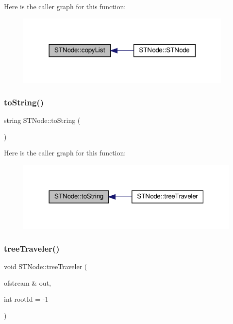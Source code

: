 Here is the caller graph for this function\+:\nopagebreak
\begin{figure}[H]
\begin{center}
\leavevmode
\includegraphics[width=306pt]{d0/d75/class_s_t_node_a55d1f2a5254f3ef8ec9f0f5023177798_icgraph}
\end{center}
\end{figure}
\mbox{\label{class_s_t_node_acb631ef4448c8faf7c88c9c61568ca0a}} 
\subsubsection{\texorpdfstring{to\+String()}{toString()}}
{\footnotesize\ttfamily string S\+T\+Node\+::to\+String (\begin{DoxyParamCaption}{ }\end{DoxyParamCaption})}

Here is the caller graph for this function\+:\nopagebreak
\begin{figure}[H]
\begin{center}
\leavevmode
\includegraphics[width=318pt]{d0/d75/class_s_t_node_acb631ef4448c8faf7c88c9c61568ca0a_icgraph}
\end{center}
\end{figure}
\mbox{\label{class_s_t_node_a1850972d568af9275b19b828522df434}} 
\subsubsection{\texorpdfstring{tree\+Traveler()}{treeTraveler()}}
{\footnotesize\ttfamily void S\+T\+Node\+::tree\+Traveler (\begin{DoxyParamCaption}\item[{ofstream \&}]{out,  }\item[{int}]{root\+Id = {\ttfamily -\/1} }\end{DoxyParamCaption})}

